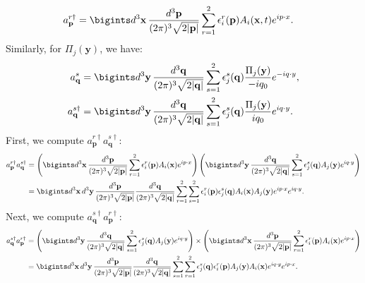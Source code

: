 \begin{enumerate}
\begin{align}
    a^{r\dagger}_{\mathbf{p}} &= \bigints d^3 \mathbf{x} \, \frac{d^3 \mathbf{p}}{(2\pi)^3 \sqrt{2|\mathbf{p}|}} \sum_{r=1}^2 \epsilon_i^r(\mathbf{p}) A_i(\mathbf{x}, t) e^{i p \cdot x}.
\end{align}
Similarly, for $\Pi_j(\mathbf{y})$, we have:
\begin{align}
    a^s_{\mathbf{q}} &= \bigints d^3 \mathbf{y} \, \frac{d^3 \mathbf{q}}{(2\pi)^3 \sqrt{2|\mathbf{q}|}} \sum_{s=1}^2 \epsilon_j^s(\mathbf{q}) \frac{\Pi_j(\mathbf{y})}{-i q_0} e^{-i q \cdot y}, \\
    a^{s\dagger}_{\mathbf{q}} &= \bigints d^3 \mathbf{y} \, \frac{d^3 \mathbf{q}}{(2\pi)^3 \sqrt{2|\mathbf{q}|}} \sum_{s=1}^2 \epsilon_j^s(\mathbf{q}) \frac{\Pi_j(\mathbf{y})}{i q_0} e^{i q \cdot y}.
\end{align}
First, we compute $a^{r\dagger}_{\mathbf{p}} a^{s\dagger}_{\mathbf{q}}$:
\begin{align}
    a^{r\dagger}_{\mathbf{p}} a^{s\dagger}_{\mathbf{q}} &= \left( \bigints d^3 \mathbf{x} \, \frac{d^3 \mathbf{p}}{(2\pi)^3 \sqrt{2|\mathbf{p}|}} \sum_{r=1}^2 \epsilon_i^r(\mathbf{p}) A_i(\mathbf{x}) e^{i p \cdot x} \right) \left( \bigints d^3 \mathbf{y} \, \frac{d^3 \mathbf{q}}{(2\pi)^3 \sqrt{2|\mathbf{q}|}} \sum_{s=1}^2 \epsilon_j^s(\mathbf{q}) A_j(\mathbf{y}) e^{i q \cdot y} \right) \notag\\
    &= \bigints d^3 \mathbf{x} \, d^3 \mathbf{y} \, \frac{d^3 \mathbf{p}}{(2\pi)^3 \sqrt{2|\mathbf{p}|}} \frac{d^3 \mathbf{q}}{(2\pi)^3 \sqrt{2|\mathbf{q}|}} \sum_{r=1}^2 \sum_{s=1}^2 \epsilon_i^r(\mathbf{p}) \epsilon_j^s(\mathbf{q}) A_i(\mathbf{x}) A_j(\mathbf{y}) e^{i p \cdot x} e^{i q \cdot y}.
\end{align}
Next, we compute $a^{s\dagger}_{\mathbf{q}} a^{r\dagger}_{\mathbf{p}}$:
\begin{align}
    a^{s\dagger}_{\mathbf{q}} a^{r\dagger}_{\mathbf{p}} &= \left( \bigints d^3 \mathbf{y} \, \frac{d^3 \mathbf{q}}{(2\pi)^3 \sqrt{2|\mathbf{q}|}} \sum_{s=1}^2 \epsilon_j^s(\mathbf{q}) A_j(\mathbf{y}) e^{i q \cdot y} \right) \times \left( \bigints d^3 \mathbf{x} \, \frac{d^3 \mathbf{p}}{(2\pi)^3 \sqrt{2|\mathbf{p}|}} \sum_{r=1}^2 \epsilon_i^r(\mathbf{p}) A_i(\mathbf{x}) e^{i p \cdot x} \right) \notag\\
    &= \bigints d^3 \mathbf{x} \, d^3 \mathbf{y} \, \frac{d^3 \mathbf{p}}{(2\pi)^3 \sqrt{2|\mathbf{p}|}} \frac{d^3 \mathbf{q}}{(2\pi)^3 \sqrt{2|\mathbf{q}|}} \sum_{s=1}^2 \sum_{r=1}^2 \epsilon_j^s(\mathbf{q}) \epsilon_i^r(\mathbf{p}) A_j(\mathbf{y}) A_i(\mathbf{x}) e^{i q \cdot y} e^{i p \cdot x}.

\end{align}
\end{enumerate}
